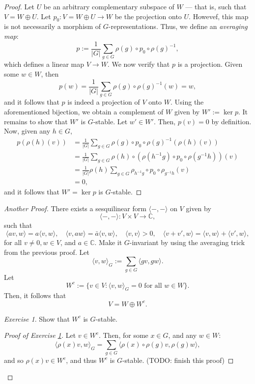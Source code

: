 \documentclass[a4paper]{report}
\theoremstyle{definition}
\theoremstyle{remark}
\theoremstyle{proposition}
\theoremstyle{conjecture}
\theoremstyle{lemma}
\theoremstyle{corollary}
\theoremstyle{exercise}
\newtheorem{exercise}{Exercise}
\theoremstyle{example}
\newcommand{\C}{\mathbb{C}}
\begin{document}
\begin{proof}
    Let $U$ be an arbitrary complementary subspace of $W$ --- that is, 
    such that $V = W \oplus U$. Let $p_0: V=W\oplus U \to W$ be the projection 
    onto $U$. Howevef, this map is not necessarily a morphism of 
    $G$-representations. Thus, we define an \emph{averaging map}: 
    $$p := \frac{1}{\vert G\vert} \sum_{g\in G} \rho(g) \circ p_0\circ \rho(g)^{-1},$$
    which defines a linear map $V \to W$. We now verify that $p$ is a projection.
    Given some $w\in W$, then 
    $$p(w) = \frac{1}{\vert G\vert} \sum_{g \in G} \rho(g) \circ \rho(g)^{-1}(w) = w,$$
    and it follows that $p$ is indeed a projection of $V$ 
    onto $W$. Using the aforementioned bijection, we obtain a complement of $W$ 
    given by $W' := \ker p$. 
    It remains to show that $W'$ is $G$-stable. Let $w'\in W'$. Then, 
    $p(v) = 0$ by definition. Now, given any $h\in G$, 
    \begin{align*}
        p(\rho(h)(v)) &= \frac{1}{\vert G\vert} \sum_{g\in G} \rho(g) \circ p_0 \circ\rho(g)^{-1}(\rho(h)(v))\\ 
                      &= \frac{1}{\vert G\vert} \sum_{g\in G} \rho(h) \circ (\rho(h^{-1}g) \circ p_0 \circ \rho(g^{-1}h))(v)\\ 
                      &= \frac{1}{\vert G \vert} \rho(h) \sum_{g \in G} \rho_{h^{-1}g} \circ p_0 \circ \rho_{g^{-1}h}(v)\\ 
                      &= 0,
\end{align*}
and it follows that $W' = \ker p$ is $G$-stable.
\end{proof}


\begin{proof}[Another Proof]
    There exists a sesquilinear form $\langle -,-\rangle$ on $V$ 
    given by $$\langle -,-\rangle : V\times V \longrightarrow \C,$$
    such that $$\langle av,w\rangle = a\langle v,w\rangle, \quad \langle v,aw\rangle = \bar{a} \langle v,w\rangle, \quad \langle v,v\rangle > 0,\quad \langle v+v',w\rangle = \langle v,w\rangle + \langle v',w\rangle,$$
    for all $v\neq 0,w \in V$, and $a\in \C$. 
    Make it $G$-invariant by using the averaging trick from the previous 
    proof. Let $$\langle v,w\rangle_G := \sum_{g\in G} \langle gv, gw\rangle.$$
    Let $$W^c := \lbrace v\in V: \text{$\langle v,w\rangle_G = 0$ for all $w \in W$}\rbrace.$$
    Then, it follows that 
    $$V = W \oplus W^c.$$
    \begin{exercise}\label{exercise5}
        Show that $W^c$ is $G$-stable.
    \end{exercise}
    \begin{proof}[Proof of Exercise \ref{exercise5}]
        Let $v \in W^c$. Then, for some $x \in G$, and any $w\in W$:
        $$\langle \rho(x)v,w\rangle_G = \sum_{g \in G} \langle \rho(x) \circ \rho(g)v, \rho(g)w\rangle,$$
        and so $\rho(x)v \in W^c$, and thus $W^c$ is $G$-stable. (TODO: 
        finish this proof)
    \end{proof}
\end{proof}
\end{document}
